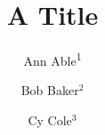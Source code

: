 \documentclass{llncs}
\newcommand{\affmark}[1]{\textsuperscript{#1}}

\title{A Title}
\author{Ann Able\affmark{1} \and Bob Baker$^{2}$ \and Cy Cole$^{3}$}
\maketitle
Body.

